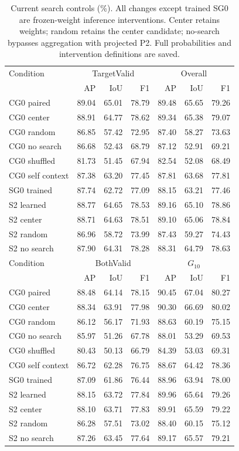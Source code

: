 \begin{table}[!t]
\caption{Current search controls (\%). All changes except trained SG0 are frozen-weight inference interventions. Center retains weights; random retains the center candidate; no-search bypasses aggregation with projected P2. Full probabilities and intervention definitions are saved.}
\label{tab:search_intervention}
\centering\scriptsize
\setlength{\tabcolsep}{2.1pt}
\renewcommand{\arraystretch}{1.03}
\begin{tabular}{lrrrrrr}
\toprule
Condition & \multicolumn{3}{c}{TargetValid} & \multicolumn{3}{c}{Overall}\\
 & AP & IoU & F1 & AP & IoU & F1\\
\midrule
CG0 paired & 89.04 & 65.01 & 78.79 & 89.48 & 65.65 & 79.26\\
CG0 center & 88.91 & 64.77 & 78.62 & 89.34 & 65.38 & 79.07\\
CG0 random & 86.85 & 57.42 & 72.95 & 87.40 & 58.27 & 73.63\\
CG0 no search & 86.68 & 52.43 & 68.79 & 87.12 & 52.91 & 69.21\\
CG0 shuffled & 81.73 & 51.45 & 67.94 & 82.54 & 52.08 & 68.49\\
CG0 self context & 87.38 & 63.20 & 77.45 & 87.81 & 63.68 & 77.81\\
SG0 trained & 87.74 & 62.72 & 77.09 & 88.15 & 63.21 & 77.46\\
S2 learned & 88.77 & 64.65 & 78.53 & 89.16 & 65.10 & 78.86\\
S2 center & 88.71 & 64.63 & 78.51 & 89.10 & 65.06 & 78.84\\
S2 random & 86.96 & 58.72 & 73.99 & 87.43 & 59.27 & 74.43\\
S2 no search & 87.90 & 64.31 & 78.28 & 88.31 & 64.79 & 78.63\\
\midrule
Condition & \multicolumn{3}{c}{BothValid} & \multicolumn{3}{c}{$G_{10}$}\\
 & AP & IoU & F1 & AP & IoU & F1\\
\midrule
CG0 paired & 88.48 & 64.14 & 78.15 & 90.45 & 67.04 & 80.27\\
CG0 center & 88.34 & 63.91 & 77.98 & 90.30 & 66.69 & 80.02\\
CG0 random & 86.12 & 56.17 & 71.93 & 88.63 & 60.19 & 75.15\\
CG0 no search & 85.97 & 51.26 & 67.78 & 88.01 & 53.29 & 69.53\\
CG0 shuffled & 80.43 & 50.13 & 66.79 & 84.39 & 53.03 & 69.31\\
CG0 self context & 86.72 & 62.28 & 76.75 & 88.67 & 64.42 & 78.36\\
SG0 trained & 87.09 & 61.86 & 76.44 & 88.96 & 63.94 & 78.00\\
S2 learned & 88.15 & 63.72 & 77.84 & 89.96 & 65.64 & 79.26\\
S2 center & 88.10 & 63.71 & 77.83 & 89.91 & 65.59 & 79.22\\
S2 random & 86.28 & 57.51 & 73.02 & 88.40 & 60.15 & 75.12\\
S2 no search & 87.26 & 63.45 & 77.64 & 89.17 & 65.57 & 79.21\\
\bottomrule
\end{tabular}
\end{table}
